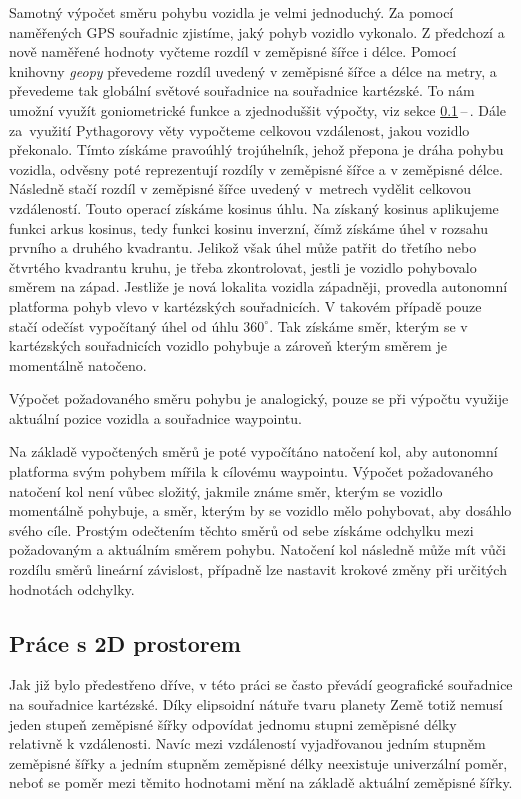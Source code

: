 \documentclass[czech, bachelor]{diploma}
\newcommand{\filipref}[1]{\ref{#1}\,--\,\nameref{#1}}
\begin{document}
Samotný výpočet směru pohybu vozidla je velmi jednoduchý. Za pomocí naměřených GPS souřadnic zjistíme, jaký pohyb vozidlo
vykonalo. Z předchozí a nově naměřené hodnoty vyčteme rozdíl v zeměpisné šířce i délce. Pomocí knihovny \emph{geopy} převedeme
rozdíl uvedený v zeměpisné šířce a délce na metry, a převedeme tak globální světové souřadnice na souřadnice kartézské. To nám
umožní využít goniometrické funkce a zjednoduššit výpočty, viz sekce \filipref{cartesian-coordinates}. Dále za~využití Pythagorovy
věty vypočteme celkovou vzdálenost, jakou vozidlo překonalo. Tímto získáme pravoúhlý trojúhelník, jehož přepona je dráha
pohybu vozidla, odvěsny poté reprezentují rozdíly v zeměpisné šířce a v zeměpisné délce. Následně stačí rozdíl v zeměpisné šířce
uvedený v~metrech vydělit celkovou vzdáleností. Touto operací získáme kosinus úhlu. Na získaný kosinus aplikujeme funkci arkus
kosinus, tedy funkci kosinu inverzní, čímž získáme úhel v rozsahu prvního a druhého kvadrantu. Jelikož však úhel může patřit do
třetího nebo čtvrtého kvadrantu kruhu, je třeba zkontrolovat, jestli je vozidlo pohybovalo směrem na západ. Jestliže je nová
lokalita vozidla západněji, provedla autonomní platforma pohyb vlevo v kartézských souřadnicích. V takovém případě pouze stačí
odečíst vypočítaný úhel od úhlu $360^{\circ}$. Tak získáme směr, kterým se v kartézských souřadnicích vozidlo pohybuje a zároveň
kterým směrem je momentálně natočeno.

Výpočet požadovaného směru pohybu je analogický, pouze se při výpočtu využije aktuální pozice vozidla a souřadnice waypointu.

Na základě vypočtených směrů je poté vypočítáno natočení kol, aby autonomní platforma svým pohybem mířila k cílovému waypointu.
Výpočet požadovaného natočení kol není vůbec složitý, jakmile známe směr, kterým se vozidlo momentálně pohybuje, a směr, kterým
by se vozidlo mělo pohybovat, aby dosáhlo svého cíle. Prostým odečtením těchto směrů od sebe získáme odchylku mezi požadovaným
a aktuálním směrem pohybu. Natočení kol následně může mít vůči rozdílu směrů lineární závislost, případně lze nastavit krokové
změny při určitých hodnotách odchylky.

\subsection{Práce s 2D prostorem} \label{cartesian-coordinates}

Jak již bylo předestřeno dříve, v této práci se často převádí geografické souřadnice na souřadnice kartézské. Díky elipsoidní
nátuře tvaru planety Země totiž nemusí jeden stupeň zeměpisné šířky odpovídat jednomu stupni zeměpisné délky relativně
k vzdálenosti. Navíc mezi vzdáleností vyjadřovanou jedním stupněm zeměpisné šířky a jedním stupněm zeměpisné délky neexistuje
univerzální poměr, neboť se poměr mezi těmito hodnotami mění na základě aktuální zeměpisné šířky.
\end{document}
